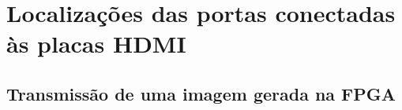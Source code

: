 {\tiny \chapter{Localizações das portas conectadas às placas HDMI} \label{ap3:LOCs}}

\section{Transmissão de uma imagem gerada na FPGA} \label{ap3:imagemFPGA_TX}


